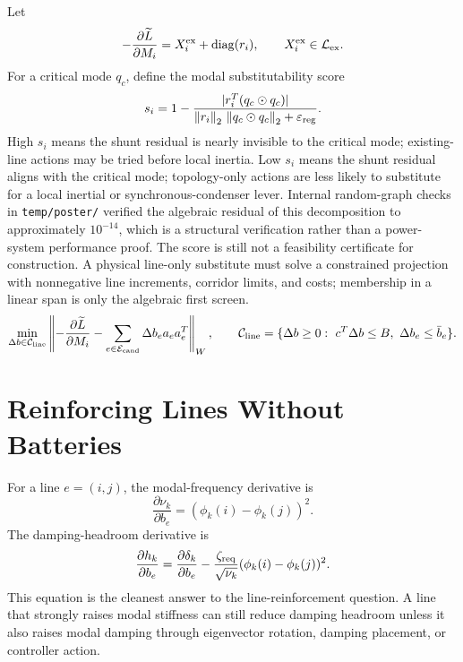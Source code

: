 Let
\begin{equation}
  -\frac{\partial\widetilde L}{\partial M_i}
  =
  X_i^{\rm ex}+\operatorname{diag}(r_i),
  \qquad
  X_i^{\rm ex}\in\mathcal L_{\rm ex}.
  \label{eq:inertia_shunt_residual}
\end{equation}
For a critical mode \(q_c\), define the modal substitutability score
\begin{equation}
  s_i
  =
  1-
  \frac{|r_i^T(q_c\odot q_c)|}
  {\left\lVert r_i \right\rVert_2\,\left\lVert q_c\odot q_c \right\rVert_2+\varepsilon_{\rm reg}}.
  \label{eq:modal_substitutability_score}
\end{equation}
High \(s_i\) means the shunt residual is nearly invisible to the critical
mode; existing-line actions may be tried before local inertia. Low \(s_i\)
means the shunt residual aligns with the critical mode; topology-only actions
are less likely to substitute for a local inertial or synchronous-condenser
lever. Internal random-graph checks in \texttt{temp/poster/} verified the
algebraic residual of this decomposition to approximately \(10^{-14}\), which
is a structural verification rather than a power-system performance proof.
The score is still not a feasibility certificate for construction. A physical
line-only substitute must solve a constrained projection with nonnegative line
increments, corridor limits, and costs; membership in a linear span is only the
algebraic first screen.
\begin{equation}
  \min_{\Delta b\in\mathcal C_{\rm line}}
  \left\|
  -\frac{\partial\Lt}{\partial M_i}
  -
  \sum_{e\in\mathcal E_{\rm cand}}\Delta b_e a_ea_e^T
  \right\|_W,
  \qquad
  \mathcal C_{\rm line}=\{\Delta b\ge0:\ c^T\Delta b\le B,\ 
  \Delta b_e\le \bar b_e\}.
  \label{eq:line_inertia_constrained_projection}
\end{equation}

\section{Reinforcing Lines Without Batteries}

For a line \(e=(i,j)\), the modal-frequency derivative is
\begin{equation}
  \frac{\partial\nu_k}{\partial b_e}
  =
  (\phi_k(i)-\phi_k(j))^2.
  \label{eq:hosting_line_frequency}
\end{equation}
The damping-headroom derivative is
\begin{equation}
  \frac{\partial h_k}{\partial b_e}
  =
  \frac{\partial\delta_k}{\partial b_e}
  -
  \frac{\zeta_{\rm req}}{\sqrt{\nu_k}}
  (\phi_k(i)-\phi_k(j))^2.
  \label{eq:hosting_line_headroom}
\end{equation}
This equation is the cleanest answer to the line-reinforcement question. A
line that strongly raises modal stiffness can still reduce damping headroom
unless it also raises modal damping through eigenvector rotation, damping
placement, or controller action.

